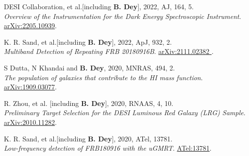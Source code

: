 \begin{etaremune}[leftmargin=40pt,labelsep=10pt]
 \item DESI Collaboration, et al.[including \textbf{B. Dey}], 2022, AJ, 164, 5. \\ \textrm{\textit{Overview of the Instrumentation for the Dark Energy Spectroscopic Instrument}}. \href{https://arxiv.org/abs/2205.10939}{arXiv:2205.10939}.
 
\item K. R. Sand, et al.[including \textbf{B. Dey}], 2022, ApJ, 932, 2. \\ \textrm{\textit{Multiband Detection of Repeating FRB 20180916B}}. \href{https://arxiv.org/abs/2111.02382}{arXiv:2111.02382 }.

\item S Dutta, N Khandai and \textbf{B. Dey}, 2020, MNRAS, 494, 2. \\ \textrm{\textit{The population of galaxies that contribute to the HI mass function}}. \href{https://arxiv.org/abs/1909.03077}{arXiv:1909.03077}.

\item R. Zhou, et al. [including \textbf{B. Dey}], 2020, RNAAS, 4, 10. \\ \textrm{\textit{Preliminary Target Selection for the DESI Luminous Red Galaxy (LRG) Sample}}. \href{https://arxiv.org/abs/2010.11282}{arXiv:2010.11282}.

\item K. R. Sand, et al.[including \textbf{B. Dey}], 2020, ATel, 13781. \\ \textrm{\textit{Low-frequency detection of FRB180916 with the uGMRT}}. \href{https://www.astronomerstelegram.org/?read=13781}{ATel:13781}.
\end{etaremune} 
